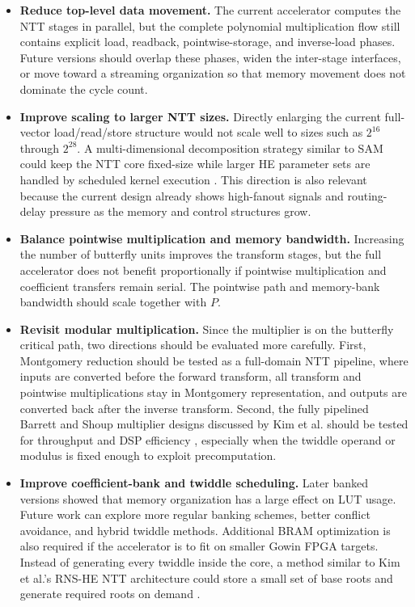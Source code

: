 \documentclass[a4paper, 12pt, titlepage]{article}
\begin{document}
\begin{itemize}
    \item \textbf{Reduce top-level data movement.} The current accelerator computes the NTT stages in parallel, but the complete polynomial multiplication flow still contains explicit load, readback, pointwise-storage, and inverse-load phases. Future versions should overlap these phases, widen the inter-stage interfaces, or move toward a streaming organization so that memory movement does not dominate the cycle count.

    \item \textbf{Improve scaling to larger NTT sizes.} Directly enlarging the current full-vector load/read/store structure would not scale well to sizes such as \(2^{16}\) through \(2^{28}\). A multi-dimensional decomposition strategy similar to SAM could keep the NTT core fixed-size while larger HE parameter sets are handled by scheduled kernel execution \cite{sam-ntt}. This direction is also relevant because the current design already shows high-fanout signals and routing-delay pressure as the memory and control structures grow.

    \item \textbf{Balance pointwise multiplication and memory bandwidth.} Increasing the number of butterfly units improves the transform stages, but the full accelerator does not benefit proportionally if pointwise multiplication and coefficient transfers remain serial. The pointwise path and memory-bank bandwidth should scale together with \(P\).

    \item \textbf{Revisit modular multiplication.} Since the multiplier is on the butterfly critical path, two directions should be evaluated more carefully. First, Montgomery reduction should be tested as a full-domain NTT pipeline, where inputs are converted before the forward transform, all transform and pointwise multiplications stay in Montgomery representation, and outputs are converted back after the inverse transform. Second, the fully pipelined Barrett and Shoup multiplier designs discussed by Kim et al. should be tested for throughput and DSP efficiency \cite{kim-modmult}, especially when the twiddle operand or modulus is fixed enough to exploit precomputation.

    \item \textbf{Improve coefficient-bank and twiddle scheduling.} Later banked versions showed that memory organization has a large effect on LUT usage. Future work can explore more regular banking schemes, better conflict avoidance, and hybrid twiddle methods. Additional BRAM optimization is also required if the accelerator is to fit on smaller Gowin FPGA targets. Instead of generating every twiddle inside the core, a method similar to Kim et al.'s RNS-HE NTT architecture could store a small set of base roots and generate required roots on demand \cite{kim-rns-ntt}.


\end{itemize}
\end{document}
